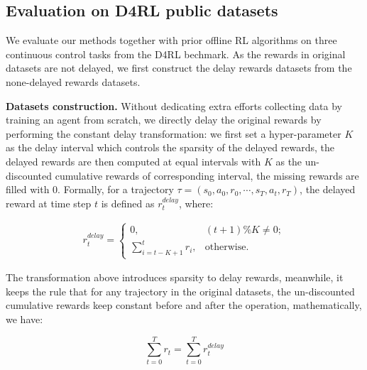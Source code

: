 \subsection{Evaluation on D4RL public datasets}

We evaluate our methods together with prior offline RL algorithms on three continuous control tasks from the D4RL bechmark. As the rewards in original datasets are not delayed, we first construct the delay rewards datasets from the none-delayed rewards datasets.

\textbf{Datasets construction.} Without dedicating extra efforts collecting data by training an agent from scratch, we directly delay the original rewards by performing the constant delay transformation: we first set a hyper-parameter $K$ as the delay interval which controls the sparsity of the delayed rewards, the delayed rewards are then computed at equal intervals with $K$ as the un-discounted cumulative rewards of corresponding interval, the missing rewards are filled with 0.
Formally, for a trajectory $\tau = \left(s_0, a_0, r_0, \cdots, s_T, a_t, r_T\right)$, the delayed reward at time step $t$ is defined as $r_t^{delay}$, where:

$$
    \begin{aligned}
        r_t^{delay} = \begin{cases}
            0,                          & \left(t + 1\right) \% K \neq 0; \\
            \sum_{i = t - K + 1}^t r_i, & \text{otherwise}.
        \end{cases}
    \end{aligned}
$$

The transformation above introduces sparsity to delay rewards, meanwhile, it keeps the rule that for any trajectory in the original datasets, the un-discounted cumulative rewards keep constant before and after the operation, mathematically, we have:

$$
    \sum_{t = 0}^{T} r_t = \sum_{t = 0}^{T} r_t^{delay}
$$

